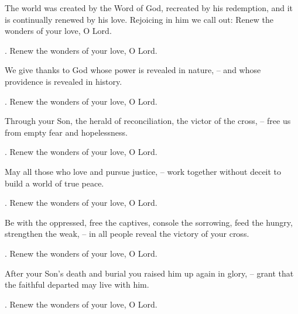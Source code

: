 \lettrine[loversize=0.15,lines=2]{T}{}he world was created by the Word of God, recreated by his redemption, and it is continually renewed by his love. Rejoicing in him we call out: Renew the wonders of your love, O Lord.
\par \Rbar. Renew the wonders of your love, O Lord.

We give thanks to God whose power is revealed in nature,
– and whose providence is revealed in history.
\par \Rbar. Renew the wonders of your love, O Lord.

Through your Son, the herald of reconciliation, the victor of the cross,
– free us from empty fear and hopelessness.
\par \Rbar. Renew the wonders of your love, O Lord.

May all those who love and pursue justice,
– work together without deceit to build a world of true peace.
\par \Rbar. Renew the wonders of your love, O Lord.

Be with the oppressed, free the captives, console the sorrowing, feed the hungry, strengthen the weak,
– in all people reveal the victory of your cross.
\par \Rbar. Renew the wonders of your love, O Lord.

After your Son’s death and burial you raised him up again in glory,
– grant that the faithful departed may live with him.
\par \Rbar. Renew the wonders of your love, O Lord.
